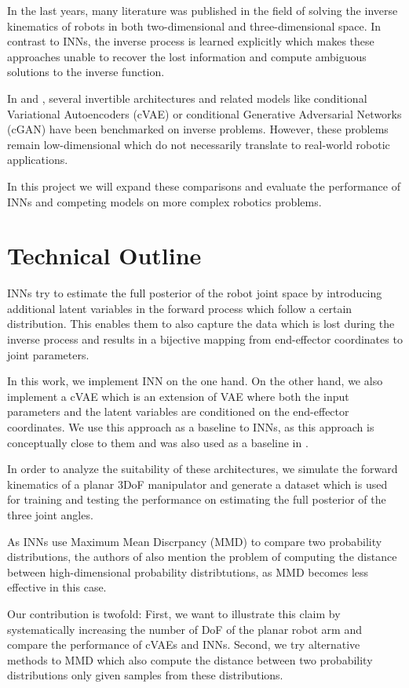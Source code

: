 \documentclass[conference]{IEEEtran}
\begin{document}
In the last years, many literature was published in the field of solving the inverse kinematics of robots in both two-dimensional \cite{Duka2014} and three-dimensional space. In contrast to INNs, the inverse process is learned explicitly which makes these approaches unable to recover the lost information and compute ambiguous solutions to the inverse function.

In \cite{Kruse2019} and \cite{Ardizzone2018}, several invertible architectures and related models like conditional Variational Autoencoders (cVAE) \cite{Sohn2015} or conditional Generative Adversarial Networks (cGAN) \cite{Mehdi2018} have been benchmarked on inverse problems. However, these problems remain low-dimensional which do not necessarily translate to real-world robotic applications.

In this project we will expand these comparisons and evaluate the performance of INNs and competing models on more complex robotics problems.

\section*{Technical Outline}

INNs try to estimate the full posterior of the robot joint space by introducing additional latent variables in the forward process which follow a certain distribution. This enables them to also capture the data which is lost during the inverse process and results in a bijective mapping from end-effector coordinates to joint parameters.

In this work, we implement INN on the one hand. On the other hand, we also implement a cVAE \cite{Sohn2015} which is an extension of VAE where both the input parameters and the latent variables are conditioned on the end-effector coordinates. We use this approach as a baseline to INNs, as this approach is conceptually close to them and was also used as a baseline in \cite{Ardizzone2018}.

In order to analyze the suitability of these architectures, we simulate the forward kinematics of a planar 3DoF manipulator and generate a dataset which is used for training and testing the performance on estimating the full posterior of the three joint angles.

As INNs use Maximum Mean Discrpancy (MMD) \cite{Gretton2008} to compare two probability distributions, the authors of \cite{Ardizzone2018} also mention the problem of computing the distance between high-dimensional probability distribtutions, as MMD becomes less effective in this case.

Our contribution is twofold: First, we want to illustrate this claim by systematically increasing the number of DoF of the planar robot arm and compare the performance of cVAEs and INNs. Second, we try alternative methods to MMD which also compute the distance between two probability distributions only given samples from these distributions.



\end{document}

